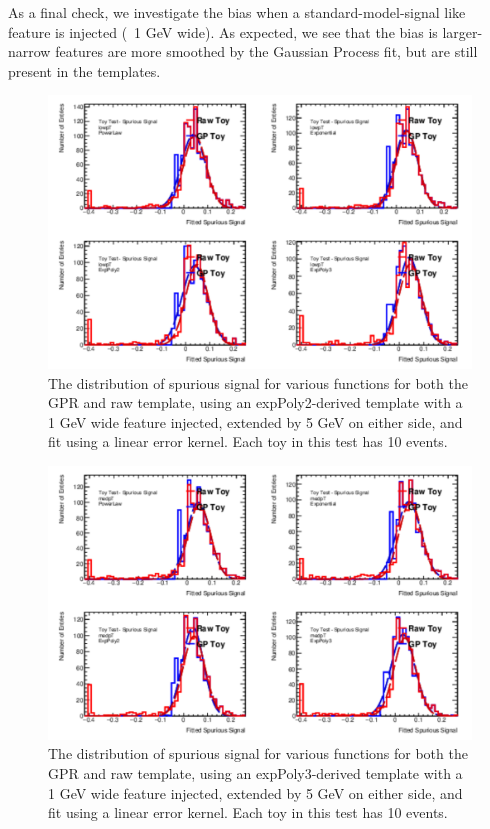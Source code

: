 As a final check, we investigate the bias when a standard-model-signal like feature is injected (~1 GeV wide). As expected, we see that the bias is larger- narrow features are more smoothed by the Gaussian Process fit, but are still present in the templates.

\begin{figure}  
\begin{center}
  \includegraphics[width=\textwidth]{figures/background/gpr/validation/linear/ToyTest_FitSigVals_lowpT_10_Sig_1s}   
\caption{The distribution of spurious signal for various functions for both the GPR and raw template, using an expPoly2-derived template with a 1 GeV wide feature injected, extended by 5 GeV on either side, and fit using a linear error kernel. Each toy in this test has 10 events.}
\label{fig:linearkernel_lowpt_10_Sig_1s}
\end{center}
\end{figure}

\begin{figure} 
\begin{center}
  \includegraphics[width=\textwidth]{figures/background/gpr/validation/linear/ToyTest_FitSigVals_medpT_10_Sig_1s}   
\caption{The distribution of spurious signal for various functions for both the GPR and raw template, using an expPoly3-derived template with a 1 GeV wide feature injected, extended by 5 GeV on either side, and fit using a linear error kernel. Each toy in this test has 10 events.}
\label{fig:linearkernel_medpt_10_Sig_1s}
\end{center}
\end{figure}

